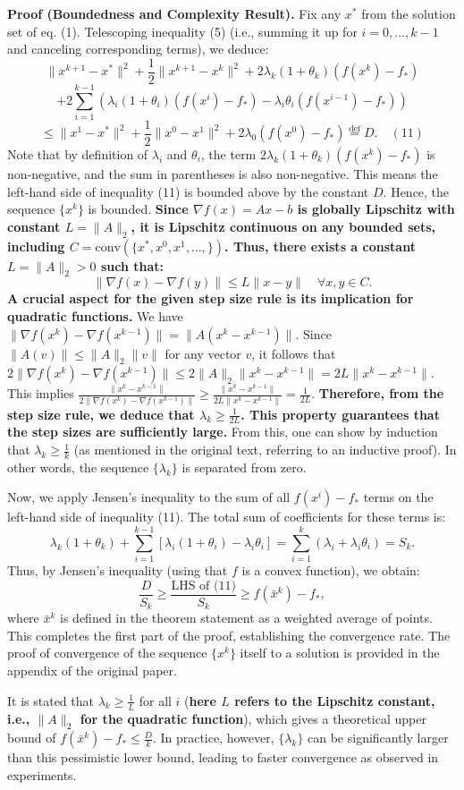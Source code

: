 \documentclass{article}
\begin{document}
\textbf{Proof (Boundedness and Complexity Result).}
Fix any $x^*$ from the solution set of eq. (1). Telescoping inequality (5) (i.e., summing it up for $i=0, \dots, k-1$ and canceling corresponding terms), we deduce:
$$ \|x^{k+1} - x^*\|^2 + \frac{1}{2}\|x^{k+1} - x^k\|^2 + 2\lambda_k(1+\theta_k)(f(x^k) - f_*) $$
$$ + 2\sum_{i=1}^{k-1} \left( \lambda_i(1+\theta_i)(f(x^i) - f_*) - \lambda_i\theta_i(f(x^{i-1}) - f_*) \right) $$
$$ \leq \|x^1 - x^*\|^2 + \frac{1}{2}\|x^0 - x^1\|^2 + 2\lambda_0(f(x^0) - f_*) \stackrel{\text{def}}{=} D. \quad (11) $$
Note that by definition of $\lambda_i$ and $\theta_i$, the term $2\lambda_k(1+\theta_k)(f(x^k) - f_*)$ is non-negative, and the sum in parentheses is also non-negative. This means the left-hand side of inequality (11) is bounded above by the constant $D$. Hence, the sequence $\{x^k\}$ is bounded. \textbf{Since $\nabla f(x) = Ax - b$ is globally Lipschitz with constant $L=\|A\|_2$, it is Lipschitz continuous on any bounded sets, including $C = \text{conv}(\{x^*, x^0, x^1, \dots, \})$. Thus, there exists a constant $L = \|A\|_2 > 0$ such that:}
$$ \|\nabla f(x) - \nabla f(y)\| \leq L\|x-y\| \quad \forall x,y \in C. $$
\textbf{A crucial aspect for the given step size rule is its implication for quadratic functions.} We have $\|\nabla f(x^k) - \nabla f(x^{k-1})\| = \|A(x^k - x^{k-1})\|$. Since $\|A(v)\| \leq \|A\|_2 \|v\|$ for any vector $v$, it follows that $2\|\nabla f(x^k) - \nabla f(x^{k-1})\| \leq 2\|A\|_2 \|x^k - x^{k-1}\| = 2L\|x^k - x^{k-1}\|$. This implies $\frac{\|x^k - x^{k-1}\|}{2\|\nabla f(x^k) - \nabla f(x^{k-1})\|} \geq \frac{\|x^k - x^{k-1}\|}{2L\|x^k - x^{k-1}\|} = \frac{1}{2L}$.
\textbf{Therefore, from the step size rule, we deduce that $\lambda_k \geq \frac{1}{2L}$. This property guarantees that the step sizes are sufficiently large.} From this, one can show by induction that $\lambda_k \geq \frac{1}{k}$ (as mentioned in the original text, referring to an inductive proof). In other words, the sequence $\{\lambda_k\}$ is separated from zero.

Now, we apply Jensen's inequality to the sum of all $f(x^i) - f_*$ terms on the left-hand side of inequality (11). The total sum of coefficients for these terms is:
$$ \lambda_k(1+\theta_k) + \sum_{i=1}^{k-1} [\lambda_i(1+\theta_i) - \lambda_i\theta_i] = \sum_{i=1}^k (\lambda_i + \lambda_i\theta_i) = S_k. $$
Thus, by Jensen's inequality (using that $f$ is a convex function), we obtain:
$$ \frac{D}{S_k} \geq \frac{\text{LHS of (11)}}{S_k} \geq f(\bar{x}^k) - f_*, $$
where $\bar{x}^k$ is defined in the theorem statement as a weighted average of points. This completes the first part of the proof, establishing the convergence rate. The proof of convergence of the sequence $\{x^k\}$ itself to a solution is provided in the appendix of the original paper.

It is stated that $\lambda_k \ge \frac{1}{L}$ for all $i$ (\textbf{here $L$ refers to the Lipschitz constant, i.e., $\|A\|_2$ for the quadratic function}), which gives a theoretical upper bound of $f(\bar{x}^k) - f_* \le \frac{D}{k}$. In practice, however, $\{\lambda_k\}$ can be significantly larger than this pessimistic lower bound, leading to faster convergence as observed in experiments.
\end{document}
